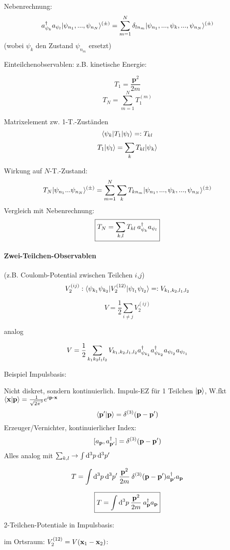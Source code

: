 \documentclass[11pt,a4paper]{report}
\renewcommand{\vec}{\boldsymbol}
\begin{document}
Nebenrechnung:
$$a_{\psi_{k}}^\dagger a_{\psi_{l}}|\psi_{n_1},...,\psi_{n_N}\rangle^{(\pm )}=\sum_{m=1}^N \delta_{ln_m}|\psi_{n_1},...,\psi_k,...,\psi_{n_N}\rangle^{(\pm )}$$
(wobei $\psi_k$ den Zustand $\psi_{n_m}$ ersetzt)\par 

Einteilchenobservablen: z.B. kinetische Energie:

$$T_1 = \frac{\vec{p}^2}{2m}$$
$$T_N = \sum_{m=1}^N T_1^{(m)}$$

Matrixelement zw. 1-T.-Zuständen
$$\langle \psi_k|T_1|\psi_l\rangle =: T_{kl}$$
$$T_1|\psi_l\rangle = \sum_k T_{kl}|\psi_k\rangle$$

Wirkung auf $N$-T.-Zustand:
$$T_N|\psi_{n_1}...\psi_{n_N}\rangle^{(\pm)} = \sum_{m=1}^N\sum_k T_{kn_m}|\psi_{n_1},...,\psi_k,...,\psi_{n_N}\rangle^{(\pm )}$$
Vergleich mit Nebenrechnung:
$$\boxed{T_N = \sum_{k,l}T_{kl}\:a_{\psi_{k}}^\dagger a_{\psi_{l}}}$$

\paragraph{Zwei-Teilchen-Observablen} (z.B. Coulomb-Potential zwischen Teilchen $i$,$j$)
$$V_2^{(ij)} : \langle \psi_{k_1}\psi_{k_2}|V_2^{(12)}|\psi_{l_1}\psi_{l_2}\rangle=: V_{k_1,k_2,l_1,l_2}$$

$$V = \frac{1}{2}\sum_{i\neq j} V_2^{(ij)}$$

analog

$$V = \frac{1}{2}\sum_{k_1k_2l_1l_2} V_{k_1,k_2,l_1,l_2}a_{\psi_{k_1}}^\dagger a_{\psi_{k_2}}^\dagger a_{\psi_{l_2}}a_{\psi_{l_1}}$$

Beispiel Impulsbasis:\par 

Nicht diskret, sondern kontinuierlich. Impuls-EZ für 1 Teilchen $|\mathbf{p}\rangle$, W.fkt $\langle \mathbf{x} | \mathbf{p} \rangle=\frac{1}{\sqrt{2\pi}^3}e^{i\mathbf{p}\cdot\mathbf{x}}$
$$\langle \mathbf{p}' | \mathbf{p} \rangle = \delta^{(3)}(\mathbf{p}-\mathbf{p}')$$
Erzeuger/Vernichter, kontinuierlicher Index:
$$[a_{\mathbf{p}},a_{\mathbf{p}'}^\dagger]=\delta^{(3)}(\mathbf{p}-\mathbf{p}')$$
Alles analog mit $\sum_{k,l} \rightarrow \int\mathrm{d}^3p\:\mathrm{d}^3p'$

$$T = \int \mathrm{d}^3p\:\mathrm{d}^3p' \: \frac{\mathbf{p}^2}{2m}\: \delta^{(3)}(\mathbf{p}-\mathbf{p}') a_{\mathbf{p}'}^\dagger a_{\mathbf{p}}$$

$$\boxed{T=\int\mathrm{d}^3p \: \frac{\mathbf{p}^2}{2m} \:a_{\mathbf{p}}^\dagger a_{\mathbf{p}}}$$

2-Teilchen-Potentiale in Impulsbasis:\par 

im Ortsraum: $V_2^{(12)}=V(\mathbf{x}_1-\mathbf{x}_2)$:
\end{document}
